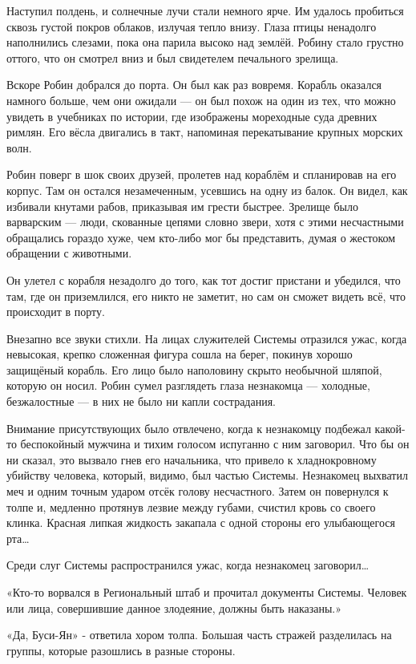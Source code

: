 \documentclass[a5paper, 9pt,
final, openany, twoside=true]{memoir}
\begin{document}
Наступил полдень, и солнечные лучи стали немного ярче. Им удалось пробиться сквозь густой покров облаков, излучая тепло внизу. Глаза птицы ненадолго наполнились слезами, пока она парила высоко над землёй. Робину стало грустно оттого, что он смотрел вниз и был свидетелем печального зрелища.\bigskip

Вскоре Робин добрался до порта. Он был как раз вовремя. Корабль оказался намного больше, чем они ожидали — он был похож на один из тех, что можно увидеть в учебниках по истории, где изображены мореходные суда древних римлян. Его вёсла двигались в такт, напоминая перекатывание крупных морских волн.

Робин поверг в шок своих друзей, пролетев над кораблём и спланировав на его корпус. Там он остался незамеченным, усевшись на одну из балок. Он видел, как избивали кнутами рабов, приказывая им грести быстрее. Зрелище было варварским — люди, скованные цепями словно звери, хотя с этими несчастными обращались гораздо хуже, чем кто-либо мог бы представить, думая о жестоком обращении с животными.

Он улетел с корабля незадолго до того, как тот достиг пристани и убедился, что там, где он приземлился, его никто не заметит, но сам он сможет видеть всё, что происходит в порту.\bigskip

Внезапно все звуки стихли. На лицах служителей Системы отразился ужас, когда невысокая, крепко сложенная фигура сошла на берег, покинув хорошо защищёный корабль. Его лицо было наполовину скрыто необычной шляпой, которую он носил. Робин сумел разглядеть глаза незнакомца — холодные, безжалостные — в них не было ни капли сострадания.

Внимание присутствующих было отвлечено, когда к незнакомцу подбежал какой-то беспокойный мужчина и тихим голосом испуганно с ним заговорил. Что бы он ни сказал, это вызвало гнев его начальника, что привело к хладнокровному убийству человека, который, видимо, был частью Системы. Незнакомец выхватил меч и одним точным ударом отсёк голову несчастного. Затем он повернулся к толпе и, медленно протянув лезвие между губами, счистил кровь со своего клинка. Красная липкая жидкость закапала с одной стороны его улыбающегося рта…

Среди слуг Системы распространился ужас, когда незнакомец заговорил…

«Кто-то ворвался в Региональный штаб и прочитал документы Системы. Человек или лица, совершившие данное злодеяние, должны быть наказаны.»

«Да, Буси-Ян» - ответила хором толпа. Большая часть стражей разделилась на группы, которые разошлись в разные стороны.
\end{document}
